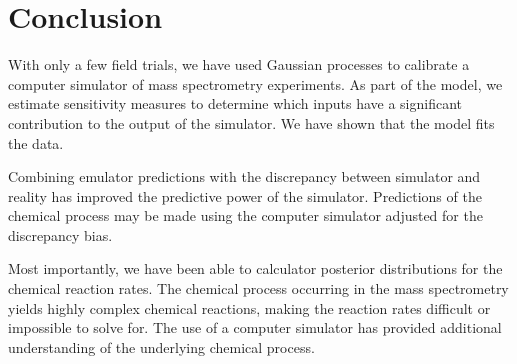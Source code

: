 \section{Conclusion}

With only a few field trials, we have used Gaussian processes to calibrate a computer simulator of mass spectrometry experiments. As part of the model, we estimate sensitivity measures to determine which inputs have a significant contribution to the output of the simulator. We have shown that the model fits the data.

Combining emulator predictions with the discrepancy between simulator and reality has improved the predictive power of the simulator. Predictions of the chemical process may be made using the computer simulator adjusted for the discrepancy bias.

Most importantly, we have been able to calculator posterior distributions for the chemical reaction rates. The chemical process occurring in the mass spectrometry yields highly complex chemical reactions, making the reaction rates difficult or impossible to solve for. The use of a computer simulator has provided additional understanding of the underlying chemical process.
